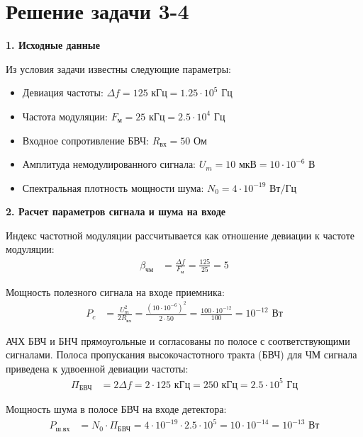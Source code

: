 \section{Решение задачи 3-4}

\vspace{1em}
\textbf{1. Исходные данные}

Из условия задачи известны следующие параметры:
\begin{itemize}
    \item Девиация частоты: $\Delta f = 125 \text{ кГц} = 1.25 \cdot 10^5 \text{ Гц}$
    \item Частота модуляции: $F_{\text{м}} = 25 \text{ кГц} = 2.5 \cdot 10^4 \text{ Гц}$
    \item Входное сопротивление БВЧ: $R_{\text{вх}} = 50 \text{ Ом}$
    \item Амплитуда немодулированного сигнала: $U_m = 10 \text{ мкВ} = 10 \cdot 10^{-6} \text{ В}$
    \item Спектральная плотность мощности шума: $N_0 = 4 \cdot 10^{-19} \text{ Вт/Гц}$
\end{itemize}

\vspace{1em}
\textbf{2. Расчет параметров сигнала и шума на входе}

Индекс частотной модуляции рассчитывается как отношение девиации к частоте модуляции:
\begin{align*}
    \beta_{\text{чм}} &= \frac{\Delta f}{F_{\text{м}}} = \frac{125}{25} = 5
\end{align*}

Мощность полезного сигнала на входе приемника:
\begin{align*}
    P_c &= \frac{U_m^2}{2 R_{\text{вх}}} = \frac{(10 \cdot 10^{-6})^2}{2 \cdot 50} = \frac{100 \cdot 10^{-12}}{100} = 10^{-12} \text{ Вт}
\end{align*}

АЧХ БВЧ и БНЧ прямоугольные и согласованы по полосе с соответствующими сигналами. Полоса пропускания высокочастотного тракта (БВЧ) для ЧМ сигнала приведена к удвоенной девиации частоты:
\begin{align*}
    \Pi_{\text{БВЧ}} &= 2 \Delta f = 2 \cdot 125 \text{ кГц} = 250 \text{ кГц} = 2.5 \cdot 10^5 \text{ Гц}
\end{align*}

Мощность шума в полосе БВЧ на входе детектора:
\begin{align*}
    P_{\text{ш.вх}} &= N_0 \cdot \Pi_{\text{БВЧ}} = 4 \cdot 10^{-19} \cdot 2.5 \cdot 10^5 = 10 \cdot 10^{-14} = 10^{-13} \text{ Вт}
\end{align*}

